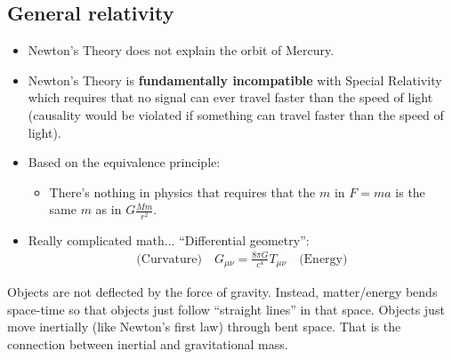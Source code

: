 \documentclass[aspectratio=169,
hyperref={colorlinks,urlcolor=blue}
]{beamer}
\begin{document}


\subsection{General relativity}
\label{subsec:generalrelativity}
{
\begin{itemize}
\item Newton's Theory does not explain the orbit of Mercury.
\item Newton's Theory is \textbf{fundamentally incompatible} with Special Relativity which requires that no signal can ever travel faster than the speed of light (causality would be violated if something can travel faster than the speed of light).
\end{itemize}
}
{
}

{
\begin{itemize}
\item Based on the equivalence principle:
\begin{itemize}
\item There’s nothing in physics that requires that the $m$ in $F=ma$ is the same $m$ as in $G\frac{Mm}{r^2}$.
\end{itemize}
\item Really complicated math... ``Differential geometry'':
\begin{align*}
\text{(Curvature)}\quad G_{\mu\nu}=\frac{8\pi G}{c^4}T_{\mu\nu}\quad \text{(Energy)}
\end{align*}
\end{itemize}
Objects are not deflected by the force of gravity. Instead, matter/energy bends space-time so that objects just follow ``straight lines'' in that space. Objects just move inertially (like Newton's first law) through bent space. That is the connection between inertial and gravitational mass.
}
{
\vspace{-1.2cm}
\vspace{-0.8cm}
}
\end{document}
